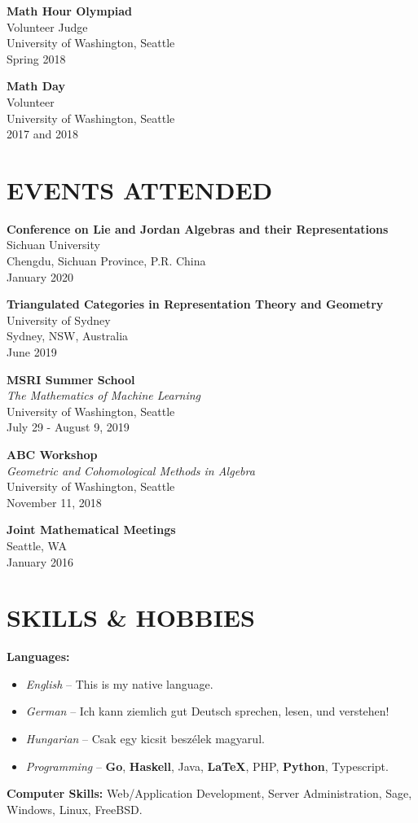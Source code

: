 \documentclass[margin]{res} %
\begin{document}
\begin{resume}
{\bf Math Hour Olympiad}\\
Volunteer Judge \\
University of Washington, Seattle\\
Spring 2018

{\bf Math Day}\\
Volunteer\\
University of Washington, Seattle\\
2017 and 2018

\section{\bf EVENTS ATTENDED}

{\bf Conference on Lie and Jordan Algebras and their Representations}\\
Sichuan University\\
Chengdu, Sichuan Province, P.R. China\\
January 2020

{\bf Triangulated Categories in Representation Theory and Geometry}\\
University of Sydney\\
Sydney, NSW, Australia\\
June 2019

{\bf MSRI Summer School}\\
{\sl The Mathematics of Machine Learning}\\
University of Washington, Seattle\\
July 29 - August 9, 2019

\pagebreak
{\bf ABC Workshop}\\
{\sl Geometric and Cohomological Methods in Algebra}\\
University of Washington, Seattle\\
November 11, 2018

{\bf Joint Mathematical Meetings}\\
Seattle, WA\\
January 2016


\section{SKILLS \& HOBBIES} 

{\bf Languages:}
\begin{itemize} \itemsep -2pt
	\item {\sl English} -- This is my native language.
	\item {\sl German} -- Ich kann ziemlich gut Deutsch sprechen, lesen, und verstehen!
	\item {\sl Hungarian} -- Csak egy kicsit besz\'elek magyarul.
	\item {\sl Programming} -- {\bf Go}, {\bf Haskell}, Java, {\bf \LaTeX}, PHP, {\bf Python}, Typescript.
\end{itemize}
{\bf Computer Skills:} Web/Application Development, Server Administration, Sage, Windows, Linux, FreeBSD.


\end{resume}
\end{document}
